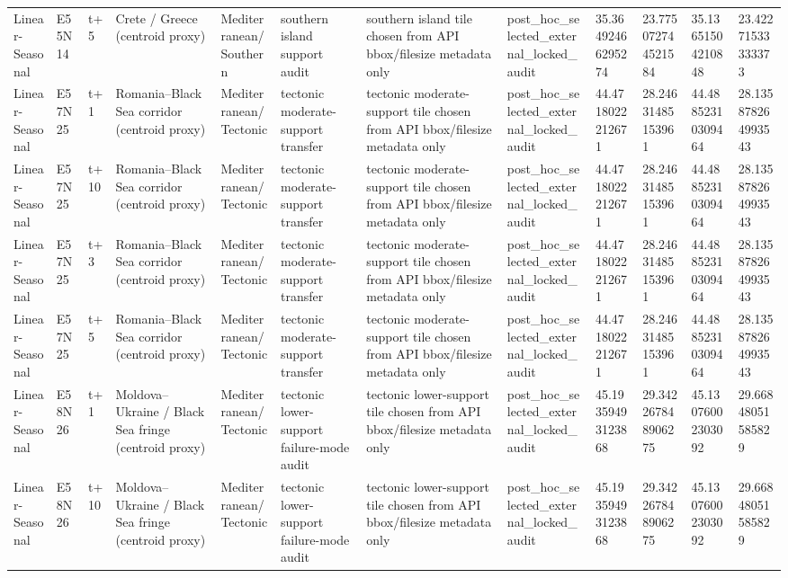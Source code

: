 \begin{landscape}
\begin{longtable}{llllllllllll}
Linear-Seasonal & E55N14 & t+5 & Crete / Greece (centroid proxy) & Mediterranean/Southern & southern island support audit & southern island tile chosen from API bbox/filesize metadata only & post\_hoc\_selected\_external\_locked\_audit & 35.36492466295274 & 23.775072744521584 & 35.13651504210848 & 23.42271533333373 \\
Linear-Seasonal & E57N25 & t+1 & Romania–Black Sea corridor (centroid proxy) & Mediterranean/Tectonic & tectonic moderate-support transfer & tectonic moderate-support tile chosen from API bbox/filesize metadata only & post\_hoc\_selected\_external\_locked\_audit & 44.4718022212671 & 28.24631485153961 & 44.48852310309464 & 28.135878264993543 \\
Linear-Seasonal & E57N25 & t+10 & Romania–Black Sea corridor (centroid proxy) & Mediterranean/Tectonic & tectonic moderate-support transfer & tectonic moderate-support tile chosen from API bbox/filesize metadata only & post\_hoc\_selected\_external\_locked\_audit & 44.4718022212671 & 28.24631485153961 & 44.48852310309464 & 28.135878264993543 \\
Linear-Seasonal & E57N25 & t+3 & Romania–Black Sea corridor (centroid proxy) & Mediterranean/Tectonic & tectonic moderate-support transfer & tectonic moderate-support tile chosen from API bbox/filesize metadata only & post\_hoc\_selected\_external\_locked\_audit & 44.4718022212671 & 28.24631485153961 & 44.48852310309464 & 28.135878264993543 \\
Linear-Seasonal & E57N25 & t+5 & Romania–Black Sea corridor (centroid proxy) & Mediterranean/Tectonic & tectonic moderate-support transfer & tectonic moderate-support tile chosen from API bbox/filesize metadata only & post\_hoc\_selected\_external\_locked\_audit & 44.4718022212671 & 28.24631485153961 & 44.48852310309464 & 28.135878264993543 \\
Linear-Seasonal & E58N26 & t+1 & Moldova–Ukraine / Black Sea fringe (centroid proxy) & Mediterranean/Tectonic & tectonic lower-support failure-mode audit & tectonic lower-support tile chosen from API bbox/filesize metadata only & post\_hoc\_selected\_external\_locked\_audit & 45.19359493123868 & 29.342267848906275 & 45.13076002303092 & 29.66848051585829 \\
Linear-Seasonal & E58N26 & t+10 & Moldova–Ukraine / Black Sea fringe (centroid proxy) & Mediterranean/Tectonic & tectonic lower-support failure-mode audit & tectonic lower-support tile chosen from API bbox/filesize metadata only & post\_hoc\_selected\_external\_locked\_audit & 45.19359493123868 & 29.342267848906275 & 45.13076002303092 & 29.66848051585829 \\

\end{longtable}
\end{landscape}
